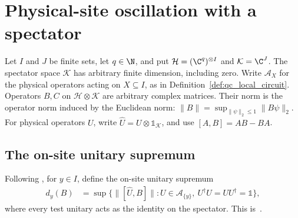
\section{Physical-site oscillation with a spectator}
\label{sec:qc_site_oscillation}

Let $I$ and $J$ be finite sets, let $q\in\N$, and put
$\mathcal H=(\C^q)^{\otimes I}$ and $\mathcal K=\C^J$.
The spectator space $\mathcal K$ has arbitrary finite dimension, including
zero. Write $\mathcal A_X$ for the physical operators acting on
$X\subseteq I$, as in Definition~\ref{def:qc_local_circuit}.
Operators $B,C$ on $\mathcal H\otimes\mathcal K$ are arbitrary complex
matrices. Their norm is the operator norm induced by the Euclidean norm:
$\|B\|=\sup_{\|\psi\|_2\le1}\|B\psi\|_2$.
For physical operators $U$, write $\widehat U=U\otimes\mathbb 1_{\mathcal K}$,
and use $[A,B]=AB-BA$.

\subsection{The on-site unitary supremum}

\begin{definition}
    \label{def:qc_site_oscillation}
    \leanok
    Following \cite{OpenAI2026AreaLaw}, for $y\in I$, define the on-site
    unitary supremum
    \begin{align}
        d_y(B) & =\sup\bigl\{\|[\widehat U,B]\|:
        U\in\mathcal A_{\{y\}},\ U^\dagger U=UU^\dagger=\mathbb 1\bigr\},
        \label{eq:qc_osc_supremum}
    \end{align}
    where every test unitary acts as the identity on the spectator.
    This is~\cite[``Oscillation at a physical site'']{QICLean2026Blueprint}.
\end{definition}

